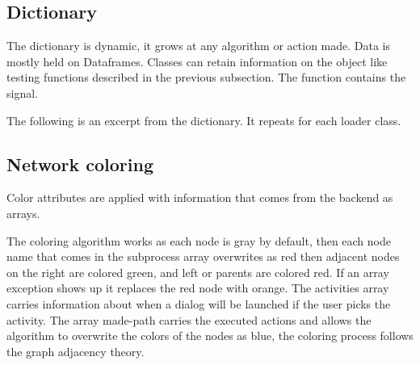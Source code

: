 \documentclass[a4paper]{article}
\begin{document}
\subsection{Dictionary}
\label{sec:org88d0e5e}

The dictionary is dynamic, it grows at any algorithm or action made. Data is mostly held on Dataframes. Classes can retain information on the object like testing functions described in the previous subsection. The function contains the signal.

The following is an excerpt from the dictionary. It repeats for each loader class.

\medskip
{}

\medskip
{}


\subsection{Network coloring}
\label{sec:org2358d7d}

Color attributes are applied with information that comes from the backend as arrays.

The coloring algorithm works as each node is gray by default, then each node name that comes in the subprocess array overwrites as red then adjacent nodes on the right are colored green, and left or parents are colored red. If an array exception shows up it replaces the red node with orange. The activities array carries information about when a dialog will be launched if the user picks the activity. The array made-path carries the executed actions and allows the algorithm to overwrite the colors of the nodes as blue, the coloring process follows the graph adjacency theory.
\end{document}
